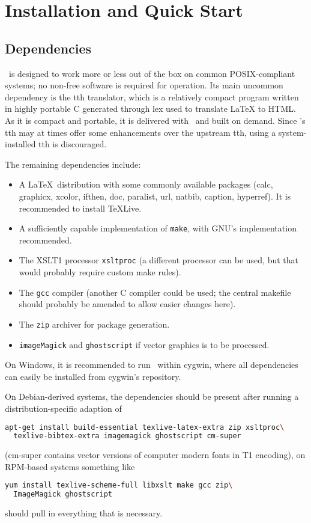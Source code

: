 \documentclass[11pt,a4paper]{ivoa}
\begin{document}
\section{Installation and Quick Start}
\label{sect:quick}

\subsection{Dependencies}

\ivoatex\ is designed to work more or less out of the box on common
POSIX-compliant systems; no non-free software is required for operation.
Its main uncommon dependency is the tth translator, which is a relatively 
compact program
written in highly portable C generated through lex used to translate LaTeX
to HTML.  As it is compact and portable, it is delivered with
\ivoatex~and built on demand.
Since \ivoatex's tth may at times offer
some enhancements over the upstream tth, using a system-installed tth is
discouraged.

The remaining dependencies include:

\begin{itemize}
\item A \LaTeX\ distribution with some commonly available packages (calc,
graphicx, xcolor, ifthen, doc, paralist, url, natbib, caption,
hyperref).
It is recommended to install TeXLive.
\item A sufficiently capable implementation of \texttt{make}, with GNU's
implementation recommended.
\item The XSLT1 processor \texttt{xsltproc} (a different processor can
be used, but that would probably require custom make rules).
\item The \texttt{gcc} compiler (another C compiler could be used; the
central makefile should probably be amended to allow easier changes
here).
\item The \texttt{zip} archiver for package generation.
\item \texttt{imageMagick} and \texttt{ghostscript} if vector graphics
is to be processed.
\end{itemize}

On Windows, it is recommended to run \ivoatex\ within cygwin, where all
dependencies can easily be installed from cygwin's repository.  

On
Debian-derived systems, the dependencies should be present after
running a distribution-specific adaption of
\begin{lstlisting}[language=sh,basicstyle=\footnotesize]
apt-get install build-essential texlive-latex-extra zip xsltproc\
  texlive-bibtex-extra imagemagick ghostscript cm-super
\end{lstlisting}
(cm-super contains vector versions of computer modern fonts in T1
encoding), on RPM-based systems something like
\begin{lstlisting}[language=sh]
yum install texlive-scheme-full libxslt make gcc zip\
  ImageMagick ghostscript
\end{lstlisting}
should pull in everything that is necessary.
\end{document}
